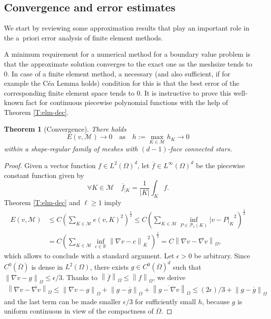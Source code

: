 \documentclass[a4paper]{amsart}
\numberwithin{equation}{section}
\theoremstyle{plain}
\newtheorem{thm}{Theorem}[section]
\theoremstyle{definition}
\begin{document}
\subsection{Convergence and error estimates}
\label{S:Conv-ErrEst}
We start by reviewing some approximation results that play an important role in 
the a~priori error analysis of finite element methods.

A minimum requirement for a numerical method for a boundary value problem is 
that the approximate solution converges to the exact one as the meshsize tends 
to $0$.  In case of a finite element method, a necessary (and also sufficient, 
if for example the C\'ea Lemma holds) condition for this is that the best error 
of the corresponding finite element space tends to $0$.  It is instructive to 
prove this well-known fact for continuous piecewise polynomial functions with 
the help of Theorem \ref{T:elm-dec}.

\begin{thm}[Convergence]
There holds
 \[
  E(v,{\mathcal{M}}) \to 0
  \quad\text{as}\quad
  h {:=} \max_{{K}\in{\mathcal{M}}} h_{K} \to 0
 \]
within a shape-regular family of meshes with $(d-1)$-face connected stars.
 \end{thm}

\begin{proof}
Given a vector function $f\in{L^{2}}(\Omega)^d$, let $\overline f\in 
{L^{\infty}}(\Omega)^d$ be the piecewise constant function given by
\[
 \forall{K}\in{\mathcal{M}}
 \quad
 \overline f_{|{K}} = \frac1{{\left|{K}\right|}} \int_{K} f.
\]
Theorem \ref{T:elm-dec} and ${\ell}\geq1$ imply
\begin{equation}\label{mv-bd}\begin{aligned}
 E(v,{\mathcal{M}}) 
 &\leq
 C \left( \sum_{{K}\in{\mathcal{M}}} e(v,{K})^2 \right)^{\frac12}
 \leq
 C \left(
  \sum_{{K}\in{\mathcal{M}}} \inf_{P\in{\mathcal{P}_{1}({{K}})}} {\left|{v-P}\right|_{K}}^2
 \right)^{\frac12}
\\
 &=
 C \left(
  \sum_{{K}\in{\mathcal{M}}} \inf_{c\in{\mathbb{R}}} {\left\|{{\nabla} v - c}\right\|_{K}}^2
 \right)^{\frac12}
 =
 C {\left\|{{\nabla} v - \overline{{\nabla} v}}\right\|_{{\Omega}}},
\end{aligned}\end{equation}
which allows to conclude with a standard argument.  Let ${\epsilon}>0$ be arbitrary. 
Since $C^0(\overline\Omega)$ is dense in ${L^{2}}(\Omega)$, there exists $g\in 
C^0(\overline\Omega)^d$ such that ${\left\|{{\nabla} v - g}\right\|_{{\Omega}}}\leq{\epsilon}/3$. 
Thanks to ${\left\|{\overline f}\right\|_{{\Omega}}}\leq{\left\|{f}\right\|_{{\Omega}}}$, we derive
\begin{multline*}
 {\left\|{{\nabla} v - \overline{{\nabla} v}}\right\|_{{\Omega}}}
 \leq
 {\left\|{{\nabla} v - g}\right\|_{{\Omega}}}
  + {\left\|{g - \overline g}\right\|_{{\Omega}}}
  + {\left\|{\overline{g-{\nabla} v}}\right\|_{{\Omega}}}
 \leq
 (2{\epsilon})/3 + {\left\|{g - \overline g}\right\|_{{\Omega}}}
\end{multline*}
and the last term can be made smaller ${\epsilon}/3$ for sufficiently small $h$, 
because $g$ is uniform continuous in view of the compactness of 
$\overline\Omega$.
\end{proof}
\end{document}
